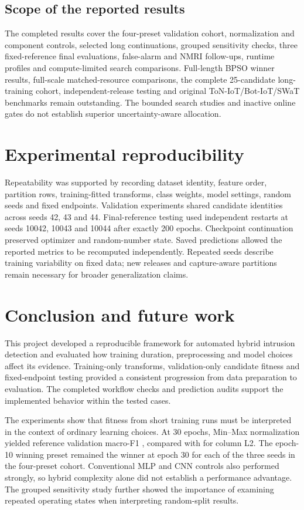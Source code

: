 \documentclass[11pt,a4paper]{report}
\begin{document}
\section{Scope of the reported results}
The completed results cover the four-preset validation cohort, normalization and component controls, selected long continuations, grouped sensitivity checks, three fixed-reference final evaluations, false-alarm and NMRI follow-ups, runtime profiles and compute-limited search comparisons. Full-length BPSO winner results, full-scale matched-resource comparisons, the complete 25-candidate long-training cohort, independent-release testing and original ToN-IoT/Bot-IoT/SWaT benchmarks remain outstanding. The bounded search studies and inactive online gates do not establish superior uncertainty-aware allocation.

\chapter{Experimental reproducibility}
Repeatability was supported by recording dataset identity, feature order, partition rows, training-fitted transforms, class weights, model settings, random seeds and fixed endpoints. Validation experiments shared candidate identities across seeds 42, 43 and 44. Final-reference testing used independent restarts at seeds 10042, 10043 and 10044 after exactly 200 epochs. Checkpoint continuation preserved optimizer and random-number state. Saved predictions allowed the reported metrics to be recomputed independently. Repeated seeds describe training variability on fixed data; new releases and capture-aware partitions remain necessary for broader generalization claims.

\chapter{Conclusion and future work}
This project developed a reproducible framework for automated hybrid intrusion detection and evaluated how training duration, preprocessing and model choices affect its evidence. Training-only transforms, validation-only candidate fitness and fixed-endpoint testing provided a consistent progression from data preparation to evaluation. The completed workflow checks and prediction audits support the implemented behavior within the tested cases.

The experiments show that fitness from short training runs must be interpreted in the context of ordinary learning choices. At 30 epochs, Min--Max normalization yielded reference validation macro-F1 \ExtMinmaxThirty{}, compared with \ExtColumnThirty{} for column L2. The epoch-10 winning preset remained the winner at epoch 30 for each of the three seeds in the four-preset cohort. Conventional MLP and CNN controls also performed strongly, so hybrid complexity alone did not establish a performance advantage. The grouped sensitivity study further showed the importance of examining repeated operating states when interpreting random-split results.
\end{document}
